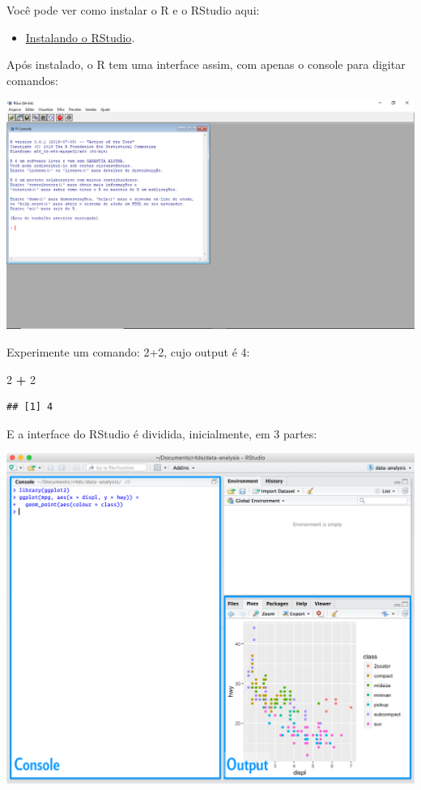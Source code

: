 \documentclass[]{book}
\newenvironment{Shaded}{\begin{snugshade}}{\end{snugshade}}
\newcommand{\DecValTok}[1]{\textcolor[rgb]{0.00,0.00,0.81}{#1}}
\newcommand{\OperatorTok}[1]{\textcolor[rgb]{0.81,0.36,0.00}{\textbf{#1}}}
\newcommand{\StringTok}[1]{\textcolor[rgb]{0.31,0.60,0.02}{#1}}
\providecommand{\tightlist}{%
  \setlength{\itemsep}{0pt}\setlength{\parskip}{0pt}}
\begin{document}
Você pode ver como instalar o R e o RStudio aqui:

\begin{itemize}
\tightlist
\item
  \href{https://www.youtube.com/watch?v=orjLGFmx6l4}{Instalando o RStudio}.
\end{itemize}

Após instalado, o R tem uma interface assim, com apenas o console para digitar comandos:

\begin{center}\includegraphics[width=0.9\linewidth]{imagens/r-project} \end{center}

Experimente um comando: 2+2, cujo output é 4:

\begin{Shaded}
\begin{Highlighting}[]
\DecValTok{2} \OperatorTok{+}\StringTok{ }\DecValTok{2}
\end{Highlighting}
\end{Shaded}

\begin{verbatim}
## [1] 4
\end{verbatim}

E a interface do RStudio é dividida, inicialmente, em 3 partes:

\begin{center}\includegraphics[width=0.9\linewidth]{imagens/rstudio-console} \end{center}
\end{document}

